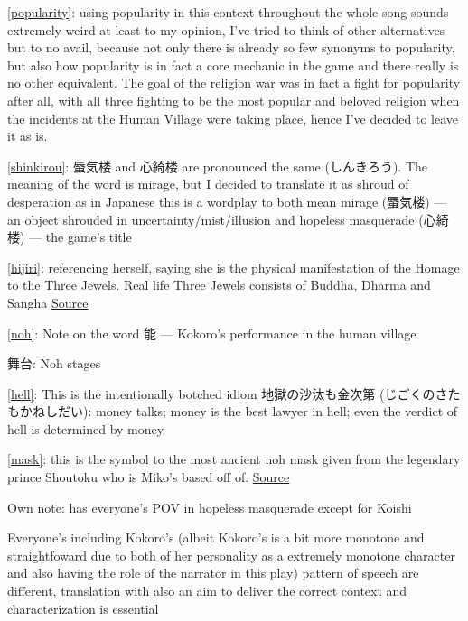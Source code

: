 \documentclass{article}
\newcommand{\tlnoteref}[1]{\hypertarget{#1tonote}{}\hyperlink{#1}{[#1]}}
\begin{document}
\tlnoteref{popularity}: using popularity in this context throughout the whole song sounds extremely weird at least to my opinion, I've tried to think of other alternatives but to no avail, because not only there is already so few synonyms to popularity, but also how popularity is in fact a core mechanic in the game and there really is no other equivalent. The goal of the religion war was in fact a fight for popularity after all, with all three fighting to be the most popular and beloved religion when the incidents at the Human Village were taking place, hence I've decided to leave it as is.

\tlnoteref{shinkirou}: 蜃気楼 and 心綺楼 are pronounced the same (しんきろう). The meaning of the word is mirage, but I decided to translate it as shroud of desperation as in Japanese this is a wordplay to both mean mirage (蜃気楼) --- an object shrouded in uncertainty/mist/illusion and hopeless masquerade (心綺楼) --- the game's title

\tlnoteref{hijiri}: referencing herself, saying she is the physical manifestation of the Homage to the Three Jewels. Real life Three Jewels consists of Buddha, Dharma and Sangha \href{https://en.wikipedia.org/wiki/Refuge_(Buddhism)}{Source}

\tlnoteref{noh}: Note on the word 能 --- Kokoro's performance in the human village

舞台: Noh stages

\tlnoteref{hell}: This is the intentionally botched idiom 地獄の沙汰も金次第 (じごくのさたもかねしだい): money talks; money is the best lawyer in hell; even the verdict of hell is determined by money

\tlnoteref{mask}: this is the symbol to the most ancient noh mask given from the legendary prince Shoutoku who is Miko's based off of. \href{en.wikipedia.org/wiki/Noh#Masks}{Source}

Own note: has everyone's POV in hopeless masquerade except for Koishi

Everyone's including Kokoro's (albeit Kokoro's is a bit more monotone and straightfoward due to both of her personality as a extremely monotone character and also having the role of the narrator in this play) pattern of speech are different, translation with also an aim to deliver the correct context and characterization is essential
\end{document}
